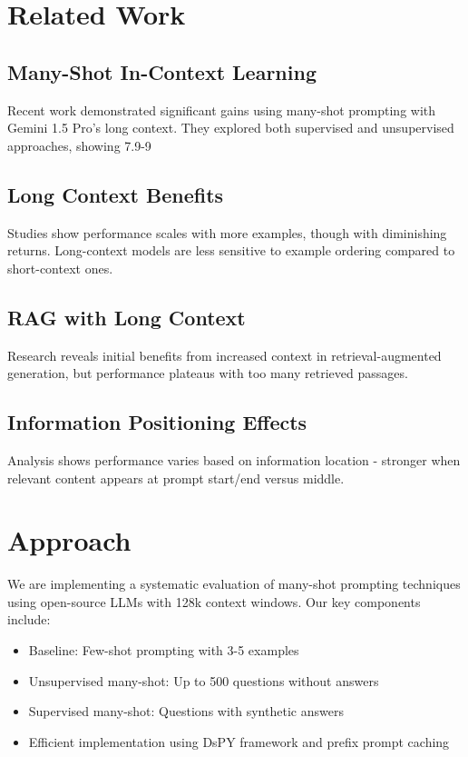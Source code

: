 \documentclass{article}
\begin{document}
\section{Related Work}
\subsection{Many-Shot In-Context Learning}
Recent work \cite{agarwal2024manyshotincontextlearning} demonstrated significant gains using many-shot prompting with Gemini 1.5 Pro's long context. They explored both supervised and unsupervised approaches, showing 7.9-9%

\subsection{Long Context Benefits}
Studies \cite{bertsch2024incontextlearninglongcontextmodels} show performance scales with more examples, though with diminishing returns. Long-context models are less sensitive to example ordering compared to short-context ones.

\subsection{RAG with Long Context}
Research \cite{jin2024longcontextllmsmeetrag} reveals initial benefits from increased context in retrieval-augmented generation, but performance plateaus with too many retrieved passages.

\subsection{Information Positioning Effects}
Analysis \cite{liu2023lostmiddlelanguagemodels} shows performance varies based on information location - stronger when relevant content appears at prompt start/end versus middle.

\section{Approach}
We are implementing a systematic evaluation of many-shot prompting techniques using open-source LLMs with 128k context windows. Our key components include:

\begin{itemize}
    \item Baseline: Few-shot prompting with 3-5 examples
    \item Unsupervised many-shot: Up to 500 questions without answers
    \item Supervised many-shot: Questions with synthetic answers
    \item Efficient implementation using DsPY framework and prefix prompt caching
\end{itemize}
\end{document}
